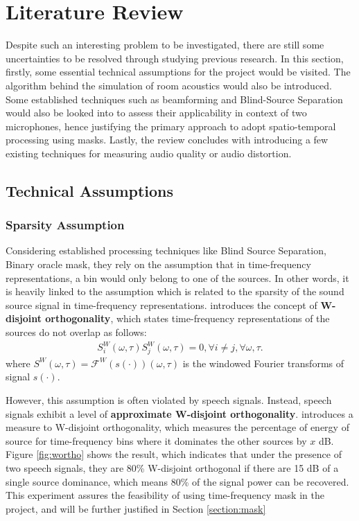 \documentclass[a4paper,twoside,12pt,hidelinks]{article}
\begin{document}
\section{Literature Review}
Despite such an interesting problem to be investigated, there are still some uncertainties to be resolved through studying previous research. In this section, firstly, some essential technical assumptions for the project would be visited. The algorithm behind the simulation of room acoustics would also be introduced. Some established techniques such as beamforming and Blind-Source Separation would also be looked into to assess their applicability in context of two microphones, hence justifying the primary approach to adopt spatio-temporal processing using masks. Lastly, the review concludes with introducing a few existing techniques for measuring audio quality or audio distortion.

\subsection{Technical Assumptions}
\label{techassum}
\subsubsection{Sparsity Assumption}
Considering established processing techniques like Blind Source Separation, Binary oracle mask, they rely on the assumption that in time-frequency representations, a bin would only belong to one of the sources. In other words, it is heavily linked to the assumption which is related to the sparsity of the sound source signal in time-frequency representations. \cite{JourjineBlindMixtures} introduces the concept of \textbf{W-disjoint orthogonality}, which states time-frequency representations of the sources do not overlap as follows:
\begin{align}
S_i^W(\omega, \tau)S_j^W(\omega, \tau) = 0, \forall i \neq j, \forall \omega, \tau.
\end{align}
where $S^W(\omega, \tau)=\mathcal{F}^W(s(\cdot))(\omega, \tau)$ is the windowed Fourier transforms of signal $s(\cdot)$.

However, this assumption is often violated by speech signals. Instead, speech signals exhibit a level of \textbf{approximate W-disjoint orthogonality}. \cite{RickardOnSpeech} introduces a measure to W-disjoint orthogonality, which measures the percentage of energy of source for time-frequency bins where it dominates the other sources by $x$ dB. Figure \ref{fig:wortho} shows the result, which indicates that under the presence of two speech signals, they are 80\% W-disjoint orthogonal if there are 15 dB of a single source dominance, which means 80\% of the signal power can be recovered. This experiment assures the feasibility of using time-frequency mask in the project, and will be further justified in Section \ref{section:mask}
\end{document}
